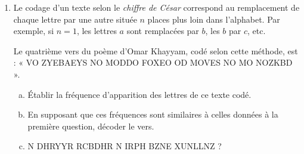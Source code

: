 \documentclass[12pt]{article}
\begin{document}
\begin{exercice}[Statistiques]
\begin{enumerate}[(1)]
      \item Le codage d'un texte selon le \emph{chiffre de César} correspond
        au remplacement de chaque lettre par une autre située $n$ places plus
        loin dans l'alphabet. Par exemple, si $n=1$, les lettres $a$ sont
        remplacées par $b$, les $b$ par $c$, etc.

        Le quatrième vers du poème d'Omar Khayyam, codé selon cette méthode, est : « VO ZYEBAEYS NO MODDO FOXEO OD MOVES NO MO NOZKBD ».

        \begin{enumerate}[(a)]
          \item Établir la fréquence d'apparition des lettres de ce texte codé.
          \item En supposant que ces fréquences sont similaires à celles données à la première question, décoder le vers.
          \item N DHRYYR RCBDHR N IRPH BZNE XUNLLNZ ?
        \end{enumerate}


    \end{enumerate}
  \end{exercice}
\end{document}
